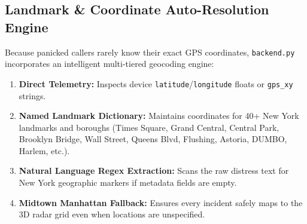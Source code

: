 \documentclass[10pt,a4paper]{article}
\begin{document}
\subsection{Landmark \& Coordinate Auto-Resolution Engine}
Because panicked callers rarely know their exact GPS coordinates, \texttt{backend.py} incorporates an intelligent multi-tiered geocoding engine:
\begin{enumerate}
  \item \textbf{Direct Telemetry:} Inspects device \texttt{latitude}/\texttt{longitude} floats or \texttt{gps\_xy} strings.
  \item \textbf{Named Landmark Dictionary:} Maintains coordinates for 40+ New York landmarks and boroughs (Times Square, Grand Central, Central Park, Brooklyn Bridge, Wall Street, Queens Blvd, Flushing, Astoria, DUMBO, Harlem, etc.).
  \item \textbf{Natural Language Regex Extraction:} Scans the raw distress text for New York geographic markers if metadata fields are empty.
  \item \textbf{Midtown Manhattan Fallback:} Ensures every incident safely maps to the 3D radar grid even when locations are unspecified.
\end{enumerate}
\end{document}

